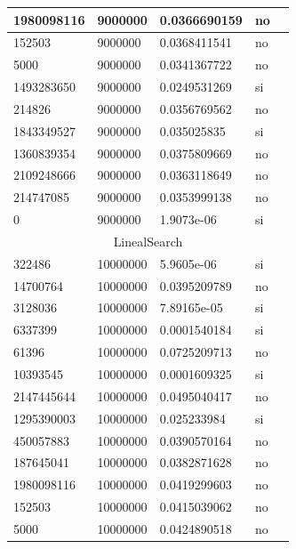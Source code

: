 \documentclass[12pt, fleqn]{article}                             %
\theoremstyle{break}                                            %
\begin{document}
\begin{longtable}{|m{5em}|m{5em}|m{10em}|m{5em}|@{}m{0pt}@{}}
            1980098116& 9000000  & 0.0366690159 & no &\\[1em]    \hline
            152503& 9000000  & 0.0368411541 & no &\\[1em]    \hline
            5000& 9000000  & 0.0341367722 & no &\\[1em]    \hline
            1493283650& 9000000  & 0.0249531269 & si &\\[1em]    \hline
            214826& 9000000  & 0.0356769562 & no &\\[1em]    \hline
            1843349527& 9000000  & 0.035025835 & si &\\[1em]    \hline
            1360839354& 9000000  & 0.0375809669 & no &\\[1em]    \hline
            2109248666& 9000000  & 0.0363118649 & no &\\[1em]    \hline
            214747085& 9000000  & 0.0353999138 & no &\\[1em]    \hline
            0& 9000000  & 1.9073e-06 & si &\\[1em]    \hline
            \multicolumn{5}{|c|}{LinealSearch}   \\          \hline
            322486& 10000000  & 5.9605e-06 & si &\\[1em]    \hline
            14700764& 10000000  & 0.0395209789 & no &\\[1em]    \hline
            3128036& 10000000  & 7.89165e-05 & si &\\[1em]    \hline
            6337399& 10000000  & 0.0001540184 & si &\\[1em]    \hline
            61396& 10000000  & 0.0725209713 & no &\\[1em]    \hline
            10393545& 10000000  & 0.0001609325 & si &\\[1em]    \hline
            2147445644& 10000000  & 0.0495040417 & no &\\[1em]    \hline
            1295390003& 10000000  & 0.025233984 & si &\\[1em]    \hline
            450057883& 10000000  & 0.0390570164 & no &\\[1em]    \hline
            187645041& 10000000  & 0.0382871628 & no &\\[1em]    \hline
            1980098116& 10000000  & 0.0419299603 & no &\\[1em]    \hline
            152503& 10000000  & 0.0415039062 & no &\\[1em]    \hline
            5000& 10000000  & 0.0424890518 & no &\\[1em]    \hline

\end{longtable}
\end{document}

